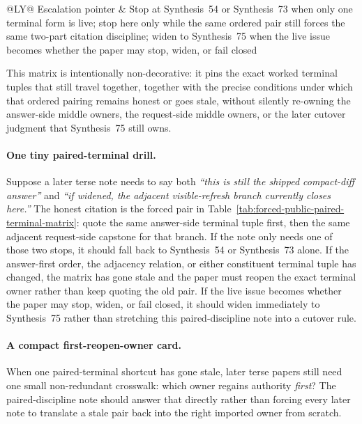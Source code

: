 \documentclass[11pt]{article}
\begin{document}
\begin{table}[t]
\begin{tabularx}{\linewidth}{@{}LY@{}}
Escalation pointer & Stop at Synthesis~54 or Synthesis~73 when only one terminal form is live; stop here only while the same ordered pair still forces the same two-part citation discipline; widen to Synthesis~75 when the live issue becomes whether the paper may stop, widen, or fail closed \\
\bottomrule
\end{tabularx}
\caption{A forced public paired-terminal matrix. This is the smallest public answer later terse papers can quote directly when the live issue is whether one concrete answer-side terminal tuple and one concrete adjacent request-side terminal tuple still force the same ordered two-part reference.}
\label{tab:forced-public-paired-terminal-matrix}
\end{table}

This matrix is intentionally non-decorative: it pins the exact worked terminal tuples that still travel together, together with the precise conditions under which that ordered pairing remains honest or goes stale, without silently re-owning the answer-side middle owners, the request-side middle owners, or the later cutover judgment that Synthesis~75 still owns.\cite{series:workedexample}

\paragraph{One tiny paired-terminal drill.}
Suppose a later terse note needs to say both \emph{``this is still the shipped compact-diff answer''} and \emph{``if widened, the adjacent visible-refresh branch currently closes here.''} The honest citation is the forced pair in Table~\ref{tab:forced-public-paired-terminal-matrix}: quote the same answer-side terminal tuple first, then the same adjacent request-side capstone for that branch. If the note only needs one of those two stops, it should fall back to Synthesis~54 or Synthesis~73 alone. If the answer-first order, the adjacency relation, or either constituent terminal tuple has changed, the matrix has gone stale and the paper must reopen the exact terminal owner rather than keep quoting the old pair. If the live issue becomes whether the paper may stop, widen, or fail closed, it should widen immediately to Synthesis~75 rather than stretching this paired-discipline note into a cutover rule.


\paragraph{A compact first-reopen-owner card.}
When one paired-terminal shortcut has gone stale, later terse papers still need one small non-redundant crosswalk: which owner regains authority \emph{first}? The paired-discipline note should answer that directly rather than forcing every later note to translate a stale pair back into the right imported owner from scratch.
\end{document}
